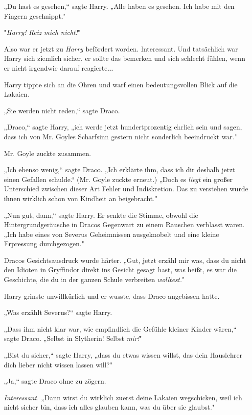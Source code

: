 {„Du hast es gesehen,“ sagte Harry. „Alle haben es gesehen. Ich habe mit den Fingern geschnippt."

"\emph{Harry! Reiz mich nicht!}"

Also war er jetzt zu \emph{Harry} befördert worden. Interessant. Und tatsächlich war Harry sich ziemlich sicher, er sollte das bemerken und sich schlecht fühlen, wenn er nicht irgendwie darauf reagierte...

Harry tippte sich an die Ohren und warf einen bedeutungsvollen Blick auf die Lakaien.

„Sie werden nicht reden,“ sagte Draco.

„Draco,“ sagte Harry, „ich werde jetzt hundertprozentig ehrlich sein und sagen, dass ich von Mr. Goyles Scharfsinn gestern nicht sonderlich beeindruckt war."

Mr. Goyle zuckte zusammen.

„Ich ebenso wenig,“ sagte Draco. „Ich erklärte ihm, dass ich dir deshalb jetzt einen Gefallen schulde.“ (Mr. Goyle zuckte erneut.) „Doch es \emph{liegt} ein großer Unterschied zwischen dieser Art Fehler und Indiskretion. Das zu verstehen wurde ihnen wirklich schon von Kindheit an beigebracht."

„Nun gut, dann,“ sagte Harry. Er senkte die Stimme, obwohl die Hintergrundgeräusche in Dracos Gegenwart zu einem Rauschen verblasst waren. „Ich habe eines von Severus Geheimnissen ausgeknobelt und eine kleine Erpressung durchgezogen."

Dracos Gesichtsausdruck wurde härter. „Gut, jetzt erzähl mir was, dass du nicht den Idioten in Gryffindor direkt ins Gesicht gesagt hast, was heißt, es war die Geschichte, die du in der ganzen Schule verbreiten \emph{wolltest.}"

Harry grinste unwillkürlich und er wusste, dass Draco angebissen hatte.

„Was erzählt Severus?“ sagte Harry.

„Dass ihm nicht klar war, wie empfindlich die Gefühle kleiner Kinder wären,“ sagte Draco. „Selbst in Slytherin! Selbst \emph{mir!}"

„Bist du sicher,“ sagte Harry, „dass du etwas wissen willst, das dein Hauslehrer dich lieber nicht wissen lassen will?"

„Ja,“ sagte Draco ohne zu zögern.

\emph{Interessant.} „Dann wirst du wirklich zuerst deine Lakaien wegschicken, weil ich nicht sicher bin, dass ich alles glauben kann, was du über sie glaubst."

}
